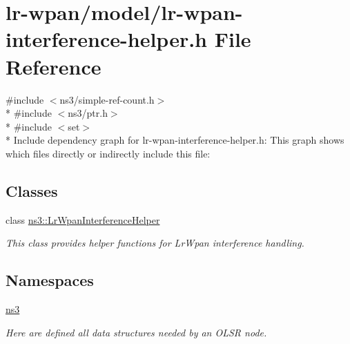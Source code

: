 \hypertarget{lr-wpan-interference-helper_8h}{}\section{lr-\/wpan/model/lr-\/wpan-\/interference-\/helper.h File Reference}
\label{lr-wpan-interference-helper_8h}
{\ttfamily \#include $<$ns3/simple-\/ref-\/count.\+h$>$}\\*
{\ttfamily \#include $<$ns3/ptr.\+h$>$}\\*
{\ttfamily \#include $<$set$>$}\\*
Include dependency graph for lr-\/wpan-\/interference-\/helper.h\+:
This graph shows which files directly or indirectly include this file\+:
\subsection*{Classes}
\begin{DoxyCompactItemize}
\item 
class \hyperlink{classns3_1_1LrWpanInterferenceHelper}{ns3\+::\+Lr\+Wpan\+Interference\+Helper}
\begin{DoxyCompactList}\small\item\em This class provides helper functions for Lr\+Wpan interference handling. \end{DoxyCompactList}\end{DoxyCompactItemize}
\subsection*{Namespaces}
\begin{DoxyCompactItemize}
\item 
 \hyperlink{namespacens3}{ns3}
\begin{DoxyCompactList}\small\item\em Here are defined all data structures needed by an O\+L\+SR node. \end{DoxyCompactList}\end{DoxyCompactItemize}
